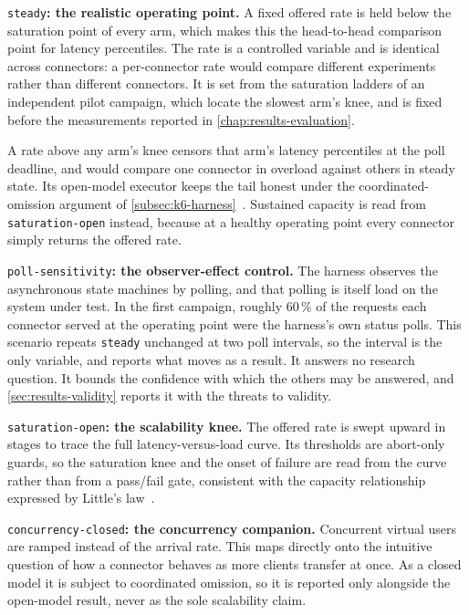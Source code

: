 \texttt{steady}\textbf{: the realistic operating point.} A fixed offered rate is held below the saturation point of every arm, which makes this the head-to-head comparison point for latency percentiles. The rate is a controlled variable and is identical across connectors: a per-connector rate would compare different experiments rather than different connectors. It is set from the saturation ladders of an independent pilot campaign, which locate the slowest arm's knee, and is fixed before the measurements reported in \cref{chap:results-evaluation}.

A rate above any arm's knee censors that arm's latency percentiles at the poll deadline, and would compare one connector in overload against others in steady state. Its open-model executor keeps the tail honest under the coordinated-omission argument of \cref{subsec:k6-harness}~\citep{schroeder2006open}. Sustained capacity is read from \texttt{saturation-open} instead, because at a healthy operating point every connector simply returns the offered rate.

\texttt{poll-sensitivity}\textbf{: the observer-effect control.} The harness observes the asynchronous state machines by polling, and that polling is itself load on the system under test. In the first campaign, roughly 60\,\% of the requests each connector served at the operating point were the harness's own status polls. This scenario repeats \texttt{steady} unchanged at two poll intervals, so the interval is the only variable, and reports what moves as a result. It answers no research question. It bounds the confidence with which the others may be answered, and \cref{sec:results-validity} reports it with the threats to validity.

\texttt{saturation-open}\textbf{: the scalability knee.} The offered rate is swept upward in stages to trace the full latency-versus-load curve. Its thresholds are abort-only guards, so the saturation knee and the onset of failure are read from the curve rather than from a pass/fail gate, consistent with the capacity relationship expressed by Little's law~\citep{little1961proof}.

\texttt{concurrency-closed}\textbf{: the concurrency companion.} Concurrent virtual users are ramped instead of the arrival rate. This maps directly onto the intuitive question of how a connector behaves as more clients transfer at once. As a closed model it is subject to coordinated omission, so it is reported only alongside the open-model result, never as the sole scalability claim.


